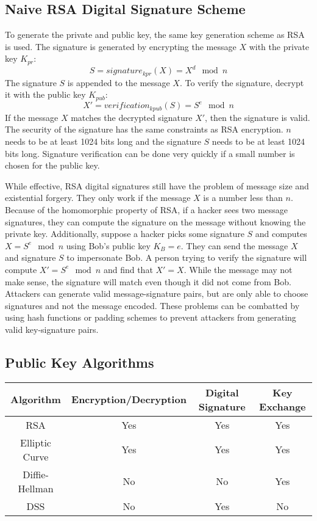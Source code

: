 \documentclass{math}
\begin{document}
\subsection*{Naive RSA Digital Signature Scheme}
To generate the private and public key, the same key generation scheme as RSA
is used. The signature is generated by encrypting the message \( X \) with the
private key \( K_{pr} \):
\[ S = signature_{kpr}(X) = X^d\mod n \]
The signature \( S \) is appended to the message \( X \). To verify the
signature, decrypt it with the public key \( K_{pub} \):
\[ X' = verification_{kpub}(S) = S^e\mod n \]
If the message \( X \) matches the decrypted signature \( X' \), then the
signature is valid. The security of the signature has the same constraints as
RSA encryption. \( n \) needs to be at least 1024 bits long and the signature
\( S \) needs to be at least 1024 bits long. Signature verification can be done
very quickly if a small number is chosen for the public key.
\par While effective, RSA digital signatures still have the problem of message
size and existential forgery. They only work if the message \( X \) is a number
less than \( n \). Because of the homomorphic property of RSA, if a hacker sees
two message signatures, they can compute the signature on the message without
knowing the private key. Additionally, suppose a hacker picks some signature
\( S \) and computes \( X = S^e\mod n \) using Bob's public key \( K_B = e \).
They can send the message \( X \) and signature \( S \) to impersonate Bob.
A person trying to verify the signature will compute \( X' = S^e\mod n \) and
find that \( X' = X \). While the message may not make sense, the signature
will match even though it did not come from Bob. Attackers can generate valid
message-signature pairs, but are only able to choose signatures and not the
message encoded. These problems can be combatted by using hash functions or
padding schemes to prevent attackers from generating valid key-signature pairs.

\subsection*{Public Key Algorithms}
\begin{center}
  \begin{tabular}{|c|c|c|c|}
    \hline
    Algorithm & Encryption/Decryption & Digital Signature & Key Exchange \\
    \hline
    RSA & Yes & Yes & Yes \\
    \hline
    Elliptic Curve & Yes & Yes & Yes \\
    \hline
    Diffie-Hellman & No & No & Yes \\
    \hline
    DSS & No & Yes & No \\
    \hline
  \end{tabular}
\end{center}
\end{document}
